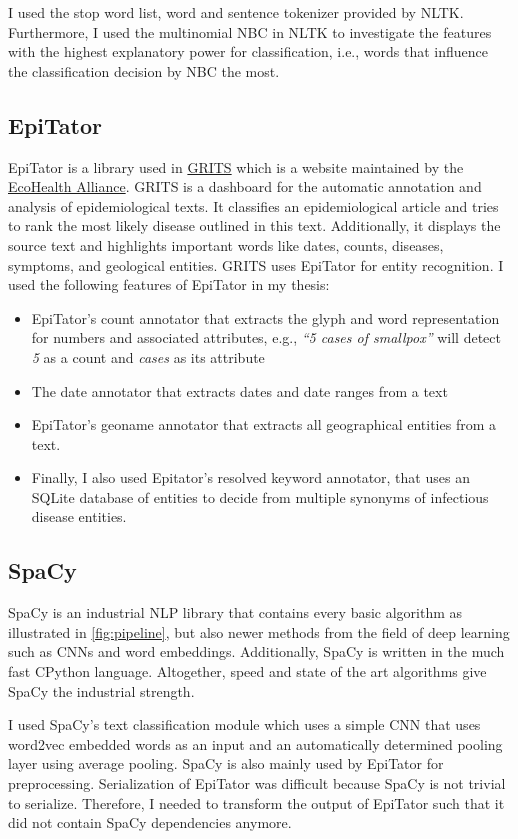 I used the stop word list, word and sentence tokenizer provided by NLTK.
Furthermore, I used the multinomial NBC in NLTK to investigate the features with the highest explanatory power for classification, i.e., words that influence the classification decision by NBC the most.


\subsection{EpiTator}
EpiTator is a library used in \href{https://grits.eha.io}{GRITS} which is a website maintained by the \href{https://www.ecohealthalliance.org}{EcoHealth Alliance}.
GRITS is a dashboard for the automatic annotation and analysis of epidemiological texts.
It classifies an epidemiological article and tries to rank the most likely disease outlined in this text.
Additionally, it displays the source text and highlights important words like dates, counts, diseases, symptoms, and geological entities.
GRITS uses EpiTator for entity recognition.
I used the following features of EpiTator in my thesis:
\begin{itemize}
  \item EpiTator's count annotator that extracts the glyph and word representation for numbers and associated attributes, e.g., \textit{``5 cases of smallpox''} will detect \textit{5} as a count and \textit{cases} as its attribute
  \item The date annotator that extracts dates and date ranges from a text
  \item EpiTator's geoname annotator that extracts all geographical entities from a text.
  \item Finally, I also used Epitator's resolved keyword annotator, that uses an SQLite database of entities to decide from multiple synonyms of infectious disease entities.
\end{itemize}


\subsection{SpaCy}
SpaCy is an industrial NLP library that contains every basic algorithm as illustrated in \ref{fig:pipeline}, but also newer methods from the field of deep learning such as CNNs and word embeddings. Additionally, SpaCy is written in the much fast CPython language. Altogether, speed and state of the art algorithms give SpaCy the industrial strength.

I used SpaCy's text classification module which uses a simple CNN that uses word2vec embedded words as an input and an automatically determined pooling layer using average pooling.
SpaCy is also mainly used by EpiTator for preprocessing. Serialization of EpiTator was difficult because SpaCy is not trivial to serialize. Therefore, I needed to transform the output of EpiTator such that it did not contain SpaCy dependencies anymore.

